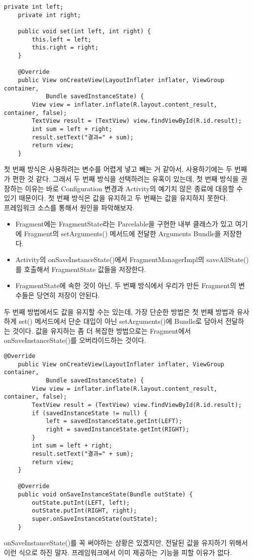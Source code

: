 \begin{lstlisting}[frame=single]
    private int left;
    private int right;

    public void set(int left, int right) {
        this.left = left;
        this.right = right;
    }

    @Override
    public View onCreateView(LayoutInflater inflater, ViewGroup container, 
    		Bundle savedInstanceState) {
        View view = inflater.inflate(R.layout.content_result, container, false);
        TextView result = (TextView) view.findViewById(R.id.result);
        int sum = left + right;
        result.setText("결과=" + sum);
        return view;
    }
\end{lstlisting}

첫 번째 방식은 사용하려는 변수를 어렵게 넣고 빼는 거 같아서, 사용하기에는 두 번째가 편한 것 같다.
그래서 두 번째 방식을 선택하려는 유혹이 있는데, 첫 번째 방식을 권장하는 이유는 바로 Configuration 변경과 Activity의 예기치 않은 종료에 대응할 수 있기 때문이다. 
첫 번째 방식은 값을 유지하고 두 번째는 값을 유지하지 못한다.\\

프레임워크 소스를 통해서 원인을 파악해보자.
\begin{itemize}
\item Fragment에는 FragmentState라는 Parcelable을 구현한 내부 클래스가 있고 여기에 Fragment의 setArguments() 메서드에 전달한 Arguments Bundle을 저장한다.
\item Activity의 onSaveInstanceState()에서 FragmentManagerImpl의 saveAllState()를 호출해서 FragmentState 값들을 저장한다.
\item FragmentState에 속한 것이 아닌, 두 번째 방식에서 우리가 만든 Fragment의 변수들은 당연히 저장이 안된다.
\end{itemize}

두 번째 방법에서도 값을 유지할 수는 있는데, 가장 단순한 방법은 첫 번째 방법과 유사하게 set() 메서드에서 단순 대입이 아닌 setArguments()에 Bundle로 담아서 전달하는 것이다. 
값을 유지하는 좀 더 복잡한 방법으로는 Fragment에서 onSaveInstanceState()를 오버라이드하는 것이다.
\begin{lstlisting}[frame=single]
    @Override
    public View onCreateView(LayoutInflater inflater, ViewGroup container, 
    		Bundle savedInstanceState) {
        View view = inflater.inflate(R.layout.content_result, container, false);
        TextView result = (TextView) view.findViewById(R.id.result);
        if (savedInstanceState != null) {
            left = savedInstanceState.getInt(LEFT);
            right = savedInstanceState.getInt(RIGHT);
        }
        int sum = left + right;
        result.setText("결과=" + sum);
        return view;
    }

    @Override
    public void onSaveInstanceState(Bundle outState) {
        outState.putInt(LEFT, left);
        outState.putInt(RIGHT, right);
        super.onSaveInstanceState(outState);
    }
\end{lstlisting}
onSaveInstanceState()를 꼭 써야하는 상황은 있겠지만, 전달된 값을 유지하기 위해서 이런 식으로 하진 말자. 프레임워크에서 이미 제공하는 기능을 피할 이유가 없다.\\

